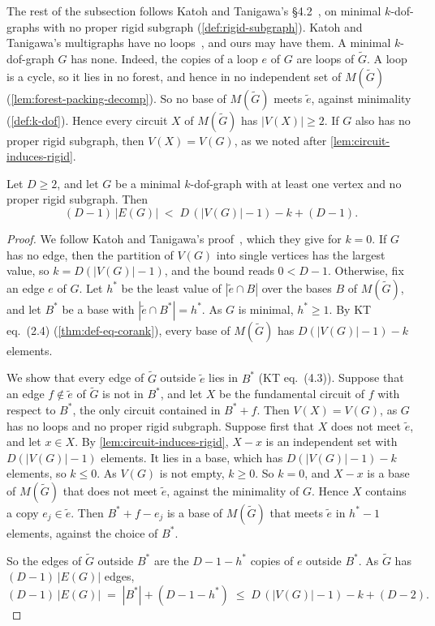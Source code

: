 The rest of the subsection follows Katoh and Tanigawa's
\S4.2~\cite[pp.~663--666]{katohTanigawa2011}, on minimal
$k$-dof-graphs with no proper rigid subgraph
(\cref{def:rigid-subgraph}). Katoh and Tanigawa's multigraphs have no
loops~\cite[\S2.5]{katohTanigawa2011}, and ours may have them. A
minimal $k$-dof-graph $G$ has none. Indeed, the copies of a loop $e$ of
$G$ are loops of $\tilde G$. A loop is a cycle, so it lies in no forest,
and hence in no independent set of $M(\tilde G)$
(\cref{lem:forest-packing-decomp}). So no base of $M(\tilde G)$ meets
$\tilde e$, against minimality (\cref{def:k-dof}). Hence every circuit
$X$ of $M(\tilde G)$ has $|V(X)| \ge 2$. If $G$ also has no proper rigid
subgraph, then $V(X) = V(G)$, as we noted after
\cref{lem:circuit-induces-rigid}.

\begin{lemma}
  \label{lem:no-rigid-edge-count}
  \leanok
  Let $D \ge 2$, and let $G$ be a minimal $k$-dof-graph with at least one
  vertex and no proper rigid subgraph. Then
  \[
    (D-1)\,|E(G)| \;<\; D\,(|V(G)| - 1) - k + (D-1).
  \]
\end{lemma}
\begin{proof}
  \leanok
  We follow Katoh and Tanigawa's proof~\cite[p.~663]{katohTanigawa2011},
  which they give for $k = 0$. If $G$ has no edge, then the partition of
  $V(G)$ into single vertices has the largest value, so
  $k = D(|V(G)| - 1)$, and the bound reads $0 < D - 1$. Otherwise, fix an
  edge $e$ of $G$. Let $h^*$ be the least value of $|\tilde e \cap B|$
  over the bases $B$ of $M(\tilde G)$, and let $B^*$ be a base with
  $|\tilde e \cap B^*| = h^*$. As $G$ is minimal, $h^* \ge 1$. By KT
  eq.~(2.4) (\cref{thm:def-eq-corank}), every base of $M(\tilde G)$ has
  $D(|V(G)| - 1) - k$ elements.

  We show that every edge of $\tilde G$ outside $\tilde e$ lies in $B^*$
  (KT eq.~(4.3)). Suppose that an edge $f \notin \tilde e$ of $\tilde G$
  is not in $B^*$, and let $X$ be the fundamental circuit of $f$ with
  respect to $B^*$, the only circuit contained in $B^* + f$. Then
  $V(X) = V(G)$, as $G$ has no loops and no proper rigid subgraph.
  Suppose first that $X$ does not meet $\tilde e$, and let $x \in X$. By
  \cref{lem:circuit-induces-rigid}, $X - x$ is an independent set with
  $D(|V(G)| - 1)$ elements. It lies in a base, which has
  $D(|V(G)| - 1) - k$ elements, so $k \le 0$. As $V(G)$ is not empty,
  $k \ge 0$. So $k = 0$, and $X - x$ is a base of $M(\tilde G)$ that does
  not meet $\tilde e$, against the minimality of $G$. Hence $X$ contains
  a copy $e_j \in \tilde e$. Then $B^* + f - e_j$ is a base of
  $M(\tilde G)$ that meets $\tilde e$ in $h^* - 1$ elements, against the
  choice of $B^*$.

  So the edges of $\tilde G$ outside $B^*$ are the $D - 1 - h^*$ copies
  of $e$ outside $B^*$. As $\tilde G$ has $(D-1)\,|E(G)|$ edges,
  \[
    (D-1)\,|E(G)| \;=\; |B^*| + (D - 1 - h^*) \;\le\;
    D\,(|V(G)| - 1) - k + (D - 2).
  \]
\end{proof}

